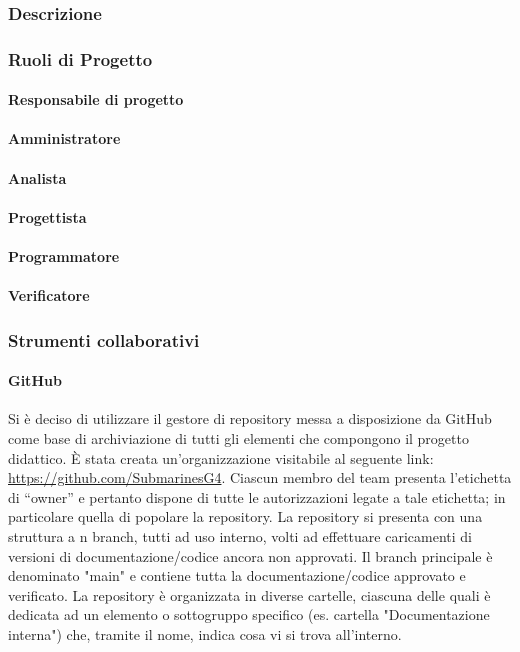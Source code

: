 \subsubsection{Descrizione}

\subsubsection{Ruoli di Progetto}
\paragraph{Responsabile di progetto}

\paragraph{Amministratore}

\paragraph{Analista}

\paragraph{Progettista}

\paragraph{Programmatore}

\paragraph{Verificatore}


\subsubsection{Strumenti collaborativi}
\paragraph{GitHub}
Si è deciso di utilizzare il gestore di repository\glo{} messa a disposizione da GitHub\glo{} come base di
archiviazione di tutti gli elementi che compongono il progetto didattico. È stata creata un’organizzazione visitabile al seguente link: \href{https://github.com/SubmarinesG4}{https://github.com/SubmarinesG4}.
Ciascun membro del team presenta l’etichetta di “owner” e pertanto dispone di tutte le autorizzazioni legate a tale etichetta; in particolare quella di popolare la repository.
La repository si presenta con una struttura a n branch, tutti ad uso interno, volti ad effettuare caricamenti di versioni di documentazione/codice ancora non approvati. Il branch principale è denominato "main" e contiene tutta la documentazione/codice approvato e verificato. 
La repository è organizzata in diverse cartelle, ciascuna delle quali è dedicata ad un elemento o sottogruppo specifico (es. cartella "Documentazione interna") che, tramite il nome, indica cosa vi si trova all'interno. 

